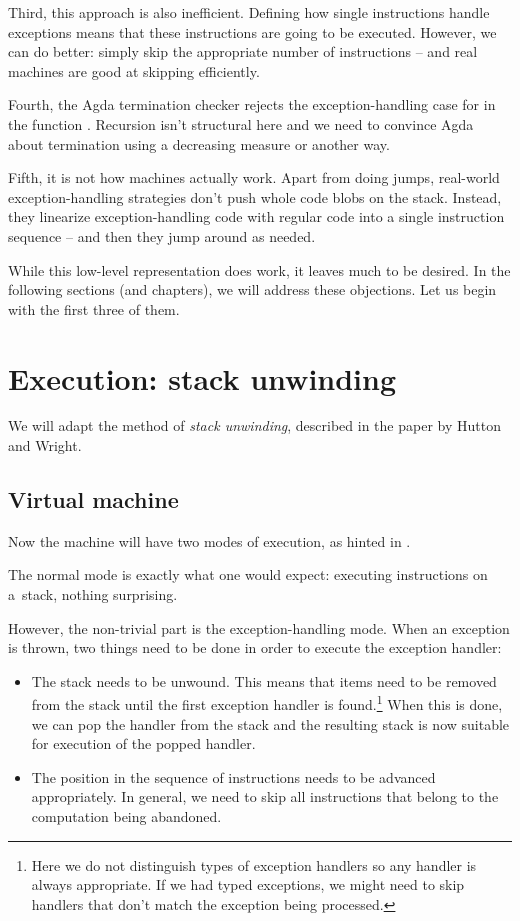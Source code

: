 Third, this approach is also inefficient. Defining how single instructions
handle exceptions means that these instructions are going to be executed.
However, we can do better: simply skip the appropriate number of instructions
-- and real machines are good at skipping efficiently.

Fourth, the Agda termination checker rejects the exception-handling case for
 in the function . Recursion isn't structural
here and we need to convince Agda about termination using a decreasing measure
or another way.

Fifth, it is not how machines actually work. Apart from doing jumps, real-world
exception-handling strategies don't push whole code blobs on the stack.
Instead, they linearize exception-handling code with regular code into a single
instruction sequence -- and then they jump around as needed.

While this low-level representation does work, it leaves much to be desired. In
the following sections (and chapters), we will address these objections. Let us
begin with the first three of them.

\section{Execution: stack unwinding}

We will adapt the method of \emph{stack unwinding}, described in the paper by Hutton
and Wright. 

\subsection{Virtual machine}

Now the machine will have two modes of execution, as hinted in
\cite[p.~7]{gmh:exceptions}.

The normal mode is exactly what one would expect: executing instructions on a~stack, nothing surprising.

However, the non-trivial part is the exception-handling mode. When an exception is thrown,
two things need to be done in order to execute the exception handler: \label{sec:stack-unwinding}
\begin{itemize}
	\item The stack needs to be unwound. This means that items need to be removed from the stack
		until the first exception handler is found.\footnote{Here we do not distinguish types
		of exception handlers so any handler is always appropriate. If we had typed
		exceptions, we might need to skip handlers that don't match the exception
		being processed.} When this is done, we can pop the handler from the stack
		and the resulting stack is now suitable for execution of the popped handler.
	\item The position in the sequence of instructions needs to be advanced
		appropriately. In general, we need to skip all instructions that belong
		to the computation being abandoned.
\end{itemize}


